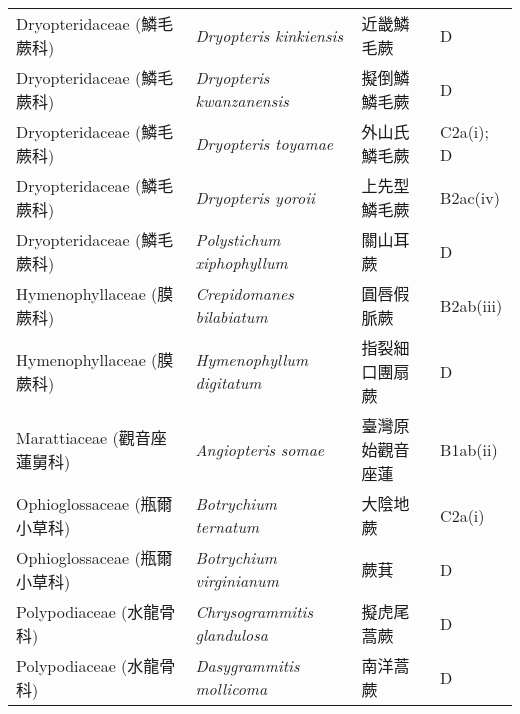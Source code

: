 \begin{longtable}{p{3cm}p{5cm}p{3cm}p{4cm}}
    Dryopteridaceae (鱗毛蕨科) & \textit{Dryopteris kinkiensis}  & 近畿鱗毛蕨 & D \index{Dryopteris@\textit{Dryopteris}!kinkiensis@\textit{kinkiensis}}  \index{近畿鱗毛蕨} \\
    Dryopteridaceae (鱗毛蕨科) & \textit{Dryopteris kwanzanensis}  & 擬倒鱗鱗毛蕨 & D \index{Dryopteris@\textit{Dryopteris}!kwanzanensis@\textit{kwanzanensis}}  \index{擬倒鱗鱗毛蕨} \\
    Dryopteridaceae (鱗毛蕨科) & \textit{Dryopteris toyamae}  & 外山氏鱗毛蕨 & C2a(i); D \index{Dryopteris@\textit{Dryopteris}!toyamae@\textit{toyamae}}  \index{外山氏鱗毛蕨} \\
    Dryopteridaceae (鱗毛蕨科) & \textit{Dryopteris yoroii}  & 上先型鱗毛蕨 & B2ac(iv) \index{Dryopteris@\textit{Dryopteris}!yoroii@\textit{yoroii}}  \index{上先型鱗毛蕨} \\
    Dryopteridaceae (鱗毛蕨科) & \textit{Polystichum xiphophyllum}  & 關山耳蕨 & D \index{Polystichum@\textit{Polystichum}!xiphophyllum@\textit{xiphophyllum}}  \index{關山耳蕨} \\
    Hymenophyllaceae (膜蕨科) & \textit{Crepidomanes bilabiatum}  & 圓唇假脈蕨 & B2ab(iii) \index{Crepidomanes@\textit{Crepidomanes}!bilabiatum@\textit{bilabiatum}}  \index{圓唇假脈蕨} \\
    Hymenophyllaceae (膜蕨科) & \textit{Hymenophyllum digitatum}  & 指裂細口團扇蕨 & D \index{Hymenophyllum@\textit{Hymenophyllum}!digitatum@\textit{digitatum}}  \index{指裂細口團扇蕨} \\
    Marattiaceae (觀音座蓮舅科) & \textit{Angiopteris somae}  & 臺灣原始觀音座蓮 & B1ab(ii) \index{Angiopteris@\textit{Angiopteris}!somae@\textit{somae}}  \index{臺灣原始觀音座蓮} \\
    Ophioglossaceae (瓶爾小草科) & \textit{Botrychium ternatum}  & 大陰地蕨 & C2a(i) \index{Botrychium@\textit{Botrychium}!ternatum@\textit{ternatum}}  \index{大陰地蕨} \\
    Ophioglossaceae (瓶爾小草科) & \textit{Botrychium virginianum}  & 蕨萁 & D \index{Botrychium@\textit{Botrychium}!virginianum@\textit{virginianum}}  \index{蕨萁} \\
    Polypodiaceae (水龍骨科) & \textit{Chrysogrammitis glandulosa}  & 擬虎尾蒿蕨 & D \index{Chrysogrammitis@\textit{Chrysogrammitis}!glandulosa@\textit{glandulosa}}  \index{擬虎尾蒿蕨} \\
    Polypodiaceae (水龍骨科) & \textit{Dasygrammitis mollicoma}  & 南洋蒿蕨 & D \index{Dasygrammitis@\textit{Dasygrammitis}!mollicoma@\textit{mollicoma}}  \index{南洋蒿蕨} \\

\end{longtable}
